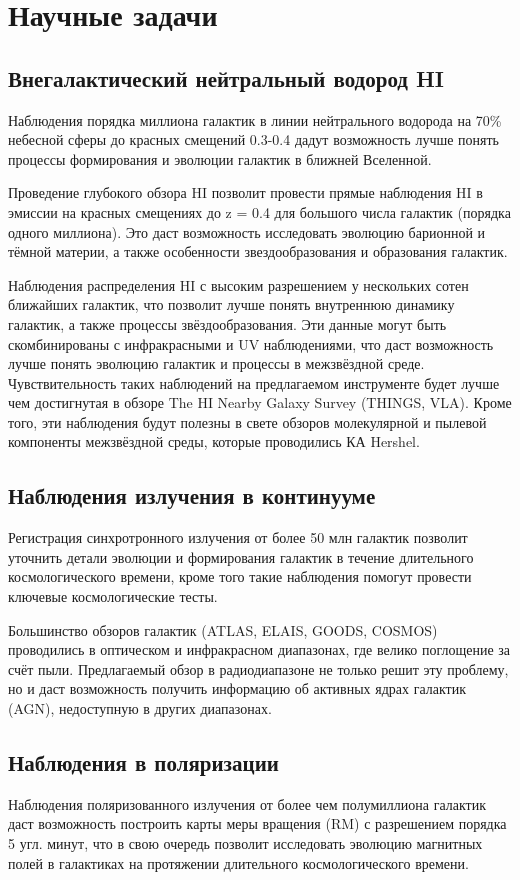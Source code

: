 \documentclass[10pt,a4paper]{article}
\begin{document}
\section{Научные задачи}

\subsection{Внегалактический нейтральный водород HI}
Наблюдения порядка миллиона галактик в линии нейтрального водорода на 70\% небесной сферы до красных смещений 0.3-0.4 дадут возможность лучше понять процессы формирования и эволюции галактик в ближней Вселенной.

Проведение глубокого обзора HI позволит провести прямые наблюдения HI в эмиссии на красных смещениях до z = 0.4 для большого числа галактик (порядка одного миллиона). Это даст возможность исследовать эволюцию барионной и тёмной материи, а также особенности звездообразования и образования галактик. 

Наблюдения распределения HI с высоким разрешением у нескольких сотен ближайших галактик, что позволит лучше понять внутреннюю динамику галактик, а также процессы звёздообразования. Эти данные могут быть скомбинированы с инфракрасными и UV наблюдениями, что даст возможность лучше понять эволюцию галактик и процессы в межзвёздной среде. Чувствительность таких наблюдений на предлагаемом инструменте будет лучше чем достигнутая в обзоре The HI Nearby Galaxy Survey (THINGS, VLA). Кроме того, эти наблюдения будут полезны в свете обзоров молекулярной и пылевой компоненты межзвёздной среды, которые проводились КА Hershel. 

\subsection{Наблюдения излучения в континууме}
Регистрация синхротронного излучения от более 50 млн галактик позволит уточнить детали эволюции и формирования галактик в течение длительного космологического времени, кроме того такие наблюдения помогут провести ключевые космологические тесты.

Большинство обзоров галактик (ATLAS, ELAIS, GOODS, COSMOS) проводились в оптическом и инфракрасном диапазонах, где велико поглощение за счёт пыли. Предлагаемый обзор в радиодиапазоне не только решит эту проблему, но и даст возможность получить информацию об активных ядрах галактик (AGN), недоступную в других диапазонах.

\subsection{Наблюдения в поляризации}
Наблюдения поляризованного излучения от более чем полумиллиона галактик даст возможность построить карты меры вращения (RM) с разрешением порядка 5 угл. минут, что в свою очередь позволит исследовать эволюцию магнитных полей в галактиках на протяжении длительного космологического времени.
\end{document}
